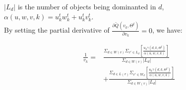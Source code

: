 \documentclass{article}
\begin{document}
 $|L_d|$ is the number of objects being dominanted in $d$,
 \\ $\alpha(u,w,v,k)=u_k^t w_k^t+u_k^t v_k^t$.
 \\

By setting the partial derivative of $\frac{\partial \tilde{Q}(v_k,\Theta^t)}{\partial v_k}=0$, we have:


\begin{equation}
\begin{aligned}
\frac{1}{v_k}= &\frac{\Sigma_{d\in W(v)}\Sigma_{v'\in L_d} [\frac{u_k \gamma(d,k,\Theta^t)}{ \alpha(u,w,v,k)}]}{\Sigma_{d\in W(v)}|L_d|}\\\nonumber
 & + \frac{\Sigma_{d\in L(v)}\Sigma_{v'\in W_d} [\frac{u_k \gamma(d,k,\Theta^t)}{\alpha(u,w,v,k)}] }{\Sigma_{d\in W(v)}|L_d|}
\end{aligned}
\end{equation}\\
\end{document}
